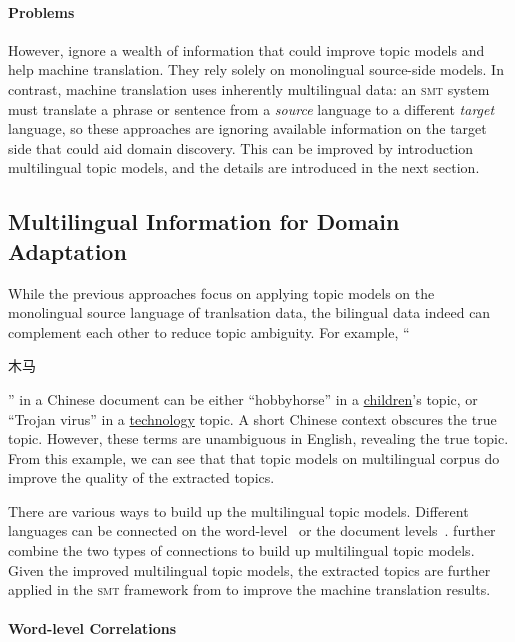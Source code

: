 \paragraph{Problems}

However, \citet{Eidelman-12,hasler-12,su-12} ignore a wealth of information that could improve topic models and help machine translation. They rely solely on monolingual source-side models. In contrast, machine translation uses inherently multilingual data: an \textsc{smt} system must translate a phrase or sentence from a \emph{source} language to a different \emph{target} language, so these approaches are ignoring available information on the target side that could aid domain discovery. This can be improved by introduction multilingual topic models, and the details are introduced in the next section.

\subsection{Multilingual Information for Domain Adaptation}
\label{sec:trans-multiling}

While the previous approaches focus on applying topic models on the monolingual source language of tranlsation data, the bilingual data indeed can complement each other to reduce topic ambiguity.  For example, ``\begin{CJK*}{UTF8}{gbsn}木马\end{CJK*}'' in a Chinese document can be either ``hobbyhorse'' in a \underline{children}'s topic, or ``Trojan virus'' in a \underline{technology} topic.  A short Chinese context obscures the true topic. However, these terms are unambiguous in English, revealing the true topic. From this example, we can see that that topic models on multilingual corpus do improve the quality of the extracted topics.

There are various ways to build up the multilingual topic models. Different languages can be connected on the word-level~\citep{boyd-graber-07,andrzejewski-09,hu-14:itm} or the document levels~\citep{mimno-09}. \citet{hu-14} further combine the two types of connections to build up multilingual topic models. Given the improved multilingual topic models, the extracted topics are further applied in the \textsc{smt} framework from \citet{Eidelman-12} to improve the machine translation results.

\paragraph{\bf Word-level Correlations}

